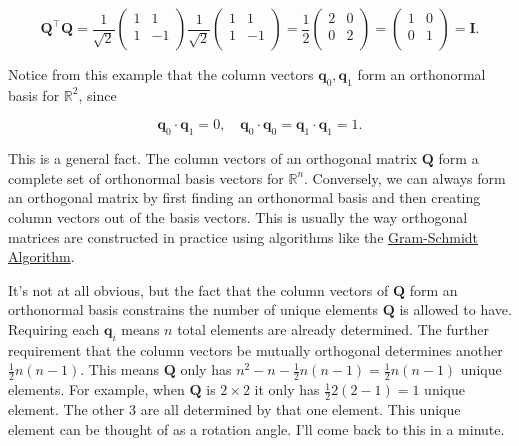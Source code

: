 \documentclass[
  letterpaper,
  DIV=11,
  numbers=noendperiod]{scrreprt}
\begin{document}
\[
\mathbf{Q}^\top \mathbf{Q} = 
\frac{1}{\sqrt{2}}
\begin{pmatrix}
1 & 1 \\
1 & -1 \\
\end{pmatrix}
\frac{1}{\sqrt{2}}
\begin{pmatrix}
1 & 1 \\
1 & -1 \\
\end{pmatrix} = 
\frac{1}{2}
\begin{pmatrix}
2 & 0 \\
0 & 2 \\
\end{pmatrix} = 
\begin{pmatrix}
1 & 0 \\
0 & 1 \\
\end{pmatrix} = \mathbf{I}.
\]

Notice from this example that the column vectors
\(\mathbf{q}_0, \mathbf{q}_1\) form an orthonormal basis for
\(\mathbb{R}^2\), since

\[\mathbf{q}_0 \cdot \mathbf{q}_1 = 0, \quad \mathbf{q}_0 \cdot \mathbf{q}_0 = \mathbf{q}_1 \cdot \mathbf{q}_1 = 1.\]

This is a general fact. The column vectors of an orthogonal matrix
\(\mathbf{Q}\) form a complete set of orthonormal basis vectors for
\(\mathbb{R}^n\). Conversely, we can always form an orthogonal matrix by
first finding an orthonormal basis and then creating column vectors out
of the basis vectors. This is usually the way orthogonal matrices are
constructed in practice using algorithms like the
\href{https://en.wikipedia.org/wiki/Gram\%E2\%80\%93Schmidt_process}{Gram-Schmidt
Algorithm}.

It's not at all obvious, but the fact that the column vectors of
\(\mathbf{Q}\) form an orthonormal basis constrains the number of unique
elements \(\mathbf{Q}\) is allowed to have. Requiring each
\(\mathbf{q}_i\) means \(n\) total elements are already determined. The
further requirement that the column vectors be mutually orthogonal
determines another \(\frac{1}{2}n(n-1)\). This means \(\mathbf{Q}\) only
has \(n^2 - n - \frac{1}{2}n(n-1) = \frac{1}{2}n(n-1)\) unique elements.
For example, when \(\mathbf{Q}\) is \(2 \times 2\) it only has
\(\frac{1}{2}2(2-1)=1\) unique element. The other \(3\) are all
determined by that one element. This unique element can be thought of as
a rotation angle. I'll come back to this in a minute.
\end{document}

